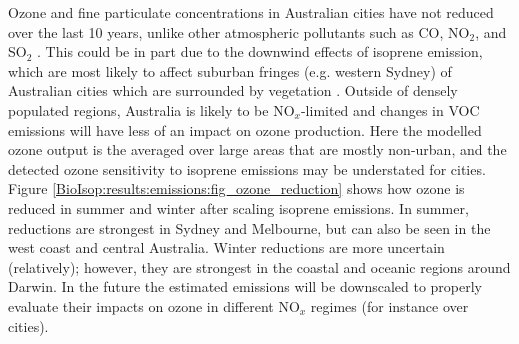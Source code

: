       Ozone and fine particulate concentrations in Australian cities have not reduced over the last 10 years, unlike other atmospheric pollutants such as CO, NO$_2$, and SO$_2$ \parencite{SOE2016}.
      This could be in part due to the downwind effects of isoprene emission, which are most likely to affect suburban fringes (e.g. western Sydney) of Australian cities which are surrounded by vegetation \parencite{Millet2016}.
      Outside of densely populated regions, Australia is likely to be NO$_x$-limited and changes in VOC emissions will have less of an impact on ozone production.
      Here the modelled ozone output is the averaged over large areas that are mostly non-urban, and the detected ozone sensitivity to isoprene emissions may be understated for cities.
      Figure \ref{BioIsop:results:emissions:fig_ozone_reduction} shows how ozone is reduced in summer and winter after scaling isoprene emissions.
      In summer, reductions are strongest in Sydney and Melbourne, but can also be seen in the west coast and central Australia.
      Winter reductions are more uncertain (relatively); however, they are strongest in the coastal and oceanic regions around Darwin.
      In the future the estimated emissions will be downscaled to properly evaluate their impacts on ozone in different NO$_x$ regimes (for instance over cities).
      
      
      
    
%      
%      

